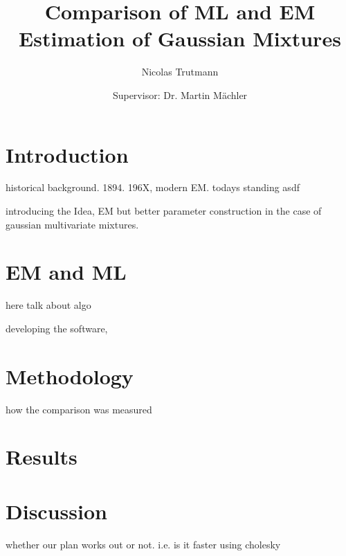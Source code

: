 


\title{Comparison of ML and EM Estimation of Gaussian Mixtures}
\author{Nicolas Trutmann \and Supervisor: Dr. Martin Mächler}




\maketitle

\tableofcontents

\section{Introduction}

historical background. 1894. 196X, modern EM. todays standing
asdf \cite{McLGP00}

introducing the Idea, EM but better parameter construction in the case of gaussian multivariate mixtures.

\section{EM and ML}

here talk about algo

developing the software,

\section{Methodology}

how the comparison was measured

\section{Results}

\section{Discussion}

whether our plan works out or not. i.e. is it faster using cholesky






